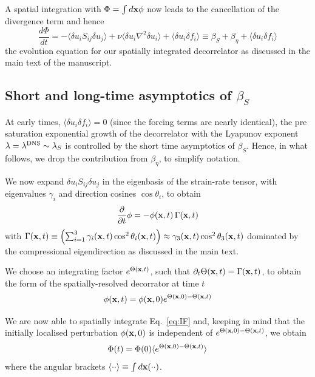 \documentclass[amsmath,amssymb,amsbsy,pre,twocolumn,tightenlines,superscriptaddress,floatfix]{revtex4-2}
\begin{document}
A spatial integration with $\Phi = \int d{\bf x} \phi$ now leads to the cancellation of the divergence term and hence
\begin{equation}
\frac{d\Phi}{dt} = - \langle \delta u_i S_{ij} \delta u_j\rangle +\nu \langle \delta u_i \nabla^2 \delta u_i \rangle + \langle \delta u_i \delta f_i\rangle \equiv \beta_S + \beta_\eta + \langle \delta u_i \delta f_i\rangle
\end{equation}
the evolution equation for our spatially integrated decorrelator as discussed in the main text of the manuscript.






\subsection{Short and long-time asymptotics of $\beta_S$}
At early times, $\langle \delta u_i \delta f_i\rangle = 0$ (since the forcing terms are nearly identical), the pre saturation exponential growth of the decorrelator with the Lyapunov exponent $\lambda = \lambda^{\rm DNS} \sim \lambda_S$
is controlled by the short time asymptotics of $\beta_S$. Hence, in what follows, we drop the contribution from
$\beta_\eta$, to simplify notation.

We now expand  $\delta u_i S_{ij} \delta u_j$ in the eigenbasis of the strain-rate tensor, with eigenvalues
$\gamma_i$ and direction cosines $\cos\theta_i$, to obtain
\begin{equation}
	\frac{\partial}{\partial t} \phi = - \phi({\bf x},t)\, \Gamma({\bf x},t)
	\label{eq:beta_S}
\end{equation}
with
$\Gamma({\bf x},t) \equiv \left(\sum_{i=1}^{3} \gamma_i({\bf x}, t) \cos^2\theta_i({\bf x}, t)\right)
\approx \gamma_3({\bf x}, t) \cos^2\theta_3({\bf x}, t)$ dominated by the compressional eigendirection
as discussed in the main text.

We choose an integrating factor  $e^{\Theta({\bf x}, t)}$, such that
$\partial_t \Theta({\bf x}, t) = \Gamma({\bf x}, t)$, to obtain the form of the spatially-resolved decorrator
at time $t$
\begin{equation}
\phi({\bf x}, t) = \phi({\bf x}, 0) e^{\Theta({\bf x}, 0) -\Theta({\bf x}, t)}
	\label{eq:IF}
\end{equation}

We are now able to spatially integrate Eq.~\eqref{eq:IF} and, keeping in mind that the initially localised perturbation
$\phi({\bf x}, 0)$ is independent of $e^{\Theta({\bf x}, 0) -\Theta({\bf x}, t)}$, we obtain
\begin{equation}
\Phi(t) = \Phi(0) \langle e^{\Theta({\bf x}, 0) -\Theta({\bf x}, t)} \rangle
	\label{eq:IF-int}
\end{equation}
where the angular brackets $\langle \cdot \cdot \rangle \equiv \int d{\bf x} (\cdot \cdot)$.
\end{document}
